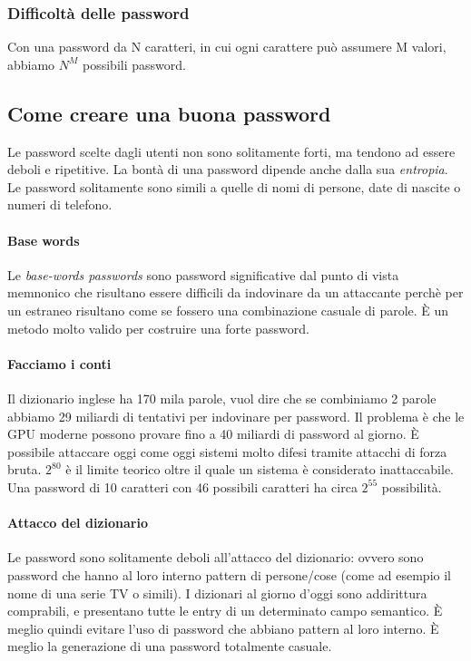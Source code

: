 \subsubsection{Difficoltà delle password}

Con una password da N caratteri, in cui ogni carattere può assumere M valori,
abbiamo $N^M$ possibili password.

\subsection{Come creare una buona password}

Le password scelte dagli utenti non sono solitamente forti, ma tendono ad
essere deboli e ripetitive. La bontà di una password dipende anche dalla sua
\textit{entropia}.
Le password solitamente sono simili a quelle di nomi di persone, date di
nascite o numeri di telefono.

\paragraph*{Base words}
Le \textit{base-words passwords} sono password significative dal punto di vista
memnonico che risultano essere difficili da indovinare da un attaccante perchè
per un estraneo risultano come se fossero una combinazione casuale di parole.
È un metodo molto valido per costruire una forte password.

\paragraph*{Facciamo i conti}

Il dizionario inglese ha 170 mila parole, vuol dire che se combiniamo 2 parole
abbiamo 29 miliardi di tentativi per indovinare per password. Il problema è che
le GPU moderne possono provare fino a 40 miliardi di password al giorno.
È possibile attaccare oggi come oggi sistemi molto difesi tramite attacchi di
forza bruta.
$2^{80}$ è il limite teorico oltre il quale un sistema è considerato
inattaccabile. Una password di 10 caratteri con 46 possibili caratteri ha circa
$2^{55}$ possibilità.

\paragraph*{Attacco del dizionario}
Le password sono solitamente deboli all'attacco del dizionario: ovvero sono
password che hanno al loro interno pattern di persone/cose (come ad esempio il
nome di una serie TV o simili). I dizionari al giorno d'oggi sono addirittura
comprabili, e presentano tutte le entry di un determinato campo semantico.
È meglio quindi evitare l'uso di password che abbiano pattern al loro interno.
È meglio la generazione di una password totalmente casuale.

